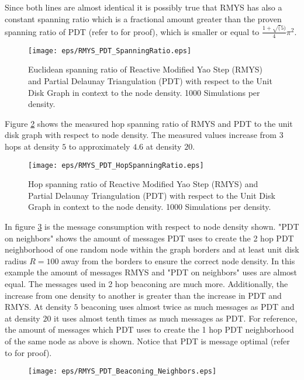 Since both lines are almost identical it is possibly true that RMYS has also a constant spanning ratio which is a fractional amount greater than the proven spanning ratio of PDT (refer to \cite{Neumann2012} for proof), which is smaller or equal to $\frac{1+\sqrt(5)}{4} \pi^2 $. 

\begin{figure}[h!]
\centering
\texttt{[image: eps/RMYS\_PDT\_SpanningRatio.eps]}
\caption{Euclidean spanning ratio of Reactive Modified Yao Step (RMYS) and Partial Delaunay Triangulation (PDT) with respect to the Unit Disk Graph in context to the node density. 1000 Simulations per density.}
\label{fig:RMYS_PDT_SpanningRatio}
\end{figure}


Figure \ref{fig:RMYS_PDT_HopSpanningRatio} shows the measured hop spanning ratio of RMYS and PDT to the unit disk graph with respect to node density.
The measured values increase from $3 $ hops at density $5 $ to approximately $4.6 $ at density $20 $.

\begin{figure}[h!]
\centering
\texttt{[image: eps/RMYS\_PDT\_HopSpanningRatio.eps]}
\caption{Hop spanning ratio of Reactive Modified Yao Step (RMYS) and Partial Delaunay Triangulation (PDT) with respect to the Unit Disk Graph in context to the node density. 1000 Simulations per density.}
\label{fig:RMYS_PDT_HopSpanningRatio}
\end{figure}



In figure \ref{fig:RMYS_PDT_Beaconing_Neighbors.eps} is the message consumption with respect to node density shown.
"PDT on neighbors" shows the amount of messages PDT uses to create the 2 hop PDT neighborhood of one random node within the graph borders and at least unit disk radius $R=100 $ away from the borders to ensure the correct node density.
In this example the amount of messages RMYS and "PDT on neighbors" uses are almost equal.
The messages used in 2 hop beaconing are much more.
Additionally, the increase from one density to another is greater than the increase in PDT and RMYS.
At density $5 $ beaconing uses almost twice as much messages as PDT and at density $20 $ it uses almost tenth times as much messages as PDT.
For reference, the amount of messages which PDT uses to create the 1 hop PDT neighborhood of the same node as above is shown.
Notice that PDT is message optimal (refer to \cite{Benter2013} for proof).

\begin{figure}[h!]
\centering
\texttt{[image: eps/RMYS\_PDT\_Beaconing\_Neighbors.eps]}
\caption{}
\label{fig:RMYS_PDT_Beaconing_Neighbors.eps}
\end{figure}

